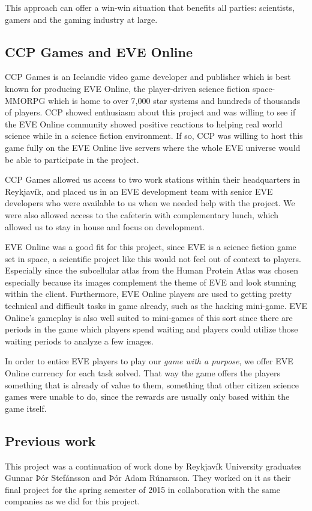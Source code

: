 	This approach can offer a win-win situation that benefits all parties: scientists, gamers and the gaming industry at large.


\subsection{CCP Games and EVE Online}

	CCP Games is an Icelandic video game developer and publisher which is best known for producing EVE Online, the player-driven science fiction space-MMORPG which is home to over 7,000 star systems and hundreds of thousands of players. CCP showed enthusiasm about this project and was willing to see if the EVE Online community showed positive reactions to helping real world science while in a science fiction environment. If so, CCP was willing to host this game fully on the EVE Online live servers where the whole EVE universe would be able to participate in the project.

	CCP Games allowed us access to two work stations within their headquarters in Reykjavík, and placed us in an EVE development team with senior EVE developers who were available to us when we needed help with the project. We were also allowed access to the cafeteria with complementary lunch, which allowed us to stay in house and focus on development.

	EVE Online was a good fit for this project, since EVE is a science fiction game set in space, a scientific project like this would not feel out of context to players. Especially since the subcellular atlas from the Human Protein Atlas was chosen especially because its images complement the theme of EVE and look stunning within the client. Furthermore, EVE Online players are used to getting pretty technical and difficult tasks in game already, such as the hacking mini-game. EVE Online's gameplay is also well suited to mini-games of this sort since there are periods in the game which players spend waiting and players could utilize those waiting periods to analyze a few images.

	In order to entice EVE players to play our \emph{game with a purpose}, we offer EVE Online currency for each task solved. That way the game offers the players something that is already of value to them, something that other citizen science games were unable to do, since the rewards are usually only based within the game itself.

\subsection{Previous work}
	This project was a continuation of work done by Reykjavík University graduates Gunnar Þór Stefánsson and Þór Adam Rúnarsson. They worked on it as their final project for the spring semester of 2015 in collaboration with the same companies as we did for this project.

